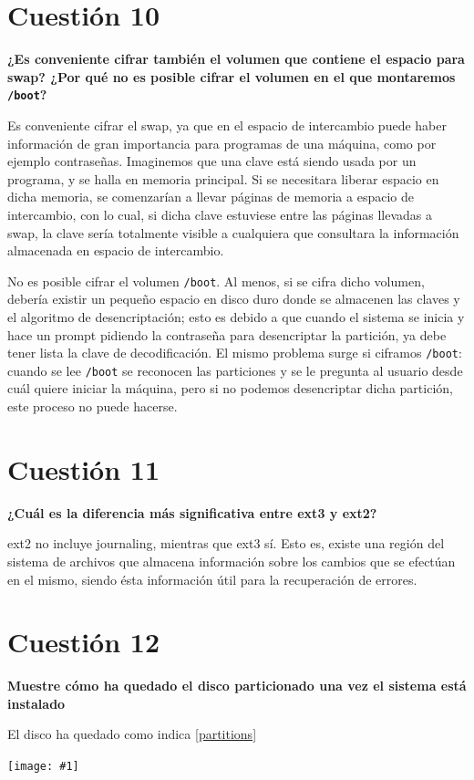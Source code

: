 \documentclass[a4paper,11pt]{article}
\newenvironment{answer}{%
\begin{list}{}{%
}%
\item[]}{\end{list}}
\newcommand{\imagen}[4]{
  \begin{minipage}{\linewidth}
    \centering
    \texttt{[image: \#1]}
    \captionof{figure}{#2}
    \label{#3}
  \end{minipage} 
}
\begin{document}
\section{Cuestión 10}
\textbf{¿Es conveniente cifrar también el volumen que contiene el espacio para swap? ¿Por qué no es posible cifrar 
el volumen en el que montaremos \texttt{/boot}?}
\begin{answer}
 Es conveniente cifrar el swap, ya que en el espacio de intercambio puede haber información de gran importancia para
 programas de una máquina, como por ejemplo contraseñas. Imaginemos que una clave está siendo usada por un programa,
 y se halla en memoria principal. Si se necesitara liberar espacio en dicha memoria, se comenzarían a llevar páginas
 de memoria a espacio de intercambio, con lo cual, si dicha clave estuviese entre las páginas llevadas a swap, la clave
 sería totalmente visible a cualquiera que consultara la información almacenada en espacio de intercambio.
 
 \cite{boot} No es posible cifrar el volumen \texttt{/boot}. Al menos, si se cifra dicho volumen, debería existir un pequeño espacio
 en disco duro donde se almacenen las claves y el algoritmo de desencriptación; esto es debido a que cuando el sistema
 se inicia y hace un prompt pidiendo la contraseña para desencriptar la partición, ya debe tener lista la clave de
 decodificación. El mismo problema surge si ciframos \texttt{/boot}: cuando se lee \texttt{/boot} se reconocen las particiones
 y se le pregunta al usuario desde cuál quiere iniciar la máquina, pero si no podemos desencriptar dicha partición, este
 proceso no puede hacerse.
 
\end{answer}

\section{Cuestión 11}
\textbf{¿Cuál es la diferencia más significativa entre ext3 y ext2?}
\begin{answer}
 ext2 no incluye journaling, mientras que ext3 sí. Esto es, existe una región del sistema de archivos que almacena
 información sobre los cambios que se efectúan en el mismo, siendo ésta información útil para la recuperación de errores.
 \cite{ext}	
\end{answer}

\section{Cuestión 12}
\textbf{Muestre cómo ha quedado el disco particionado una vez el sistema está instalado}
\begin{answer}
 El disco ha quedado como indica \ref{partitions}
 
 \imagen{./images/lsblk.png}{Particiones en Ubuntu Server}{partitions}{1}
\end{answer}
\end{document}
